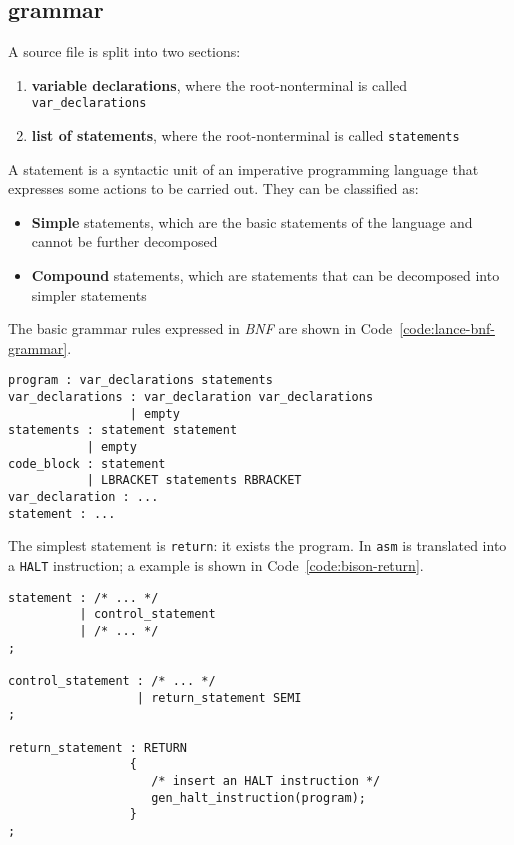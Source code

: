 \subsection{\lance grammar}

A \lance source file is split into two sections:

\begin{enumerate}
  \item \textbf{variable declarations}, where the root-nonterminal is called \texttt{var\_declarations}
  \item \textbf{list of statements}, where the root-nonterminal is called \texttt{statements}
\end{enumerate}

A statement is a syntactic unit of an imperative programming language that expresses some actions to be carried out.
They can be classified as:

\begin{itemize}
  \item \textbf{Simple} statements, which are the basic statements of the language and cannot be further decomposed
  \item \textbf{Compound} statements, which are statements that can be decomposed into simpler statements
\end{itemize}

The basic grammar rules expressed in \textit{BNF} are shown in Code~\ref{code:lance-bnf-grammar}.

\begin{onepage}
  \begin{lstlisting}[language=LANCE, caption={\lance grammar in BNF}, label={code:lance-bnf-grammar}]
program : var_declarations statements
var_declarations : var_declaration var_declarations
                 | empty
statements : statement statement
           | empty
code_block : statement
           | LBRACKET statements RBRACKET
var_declaration : ...
statement : ...
\end{lstlisting}
\end{onepage}

The simplest statement is \texttt{return}: it exists the program.
In \texttt{asm} is translated into a \texttt{HALT} instruction;
a \bison example is shown in Code~\ref{code:bison-return}.

\begin{onepage}
  \begin{lstlisting}[language=LANCE, caption={\bison return}, label={code:bison-return}]
statement : /* ... */
          | control_statement
          | /* ... */
;

control_statement : /* ... */
                  | return_statement SEMI
;

return_statement : RETURN
                 {
                    /* insert an HALT instruction */
                    gen_halt_instruction(program);
                 }
;
\end{lstlisting}
\end{onepage}

